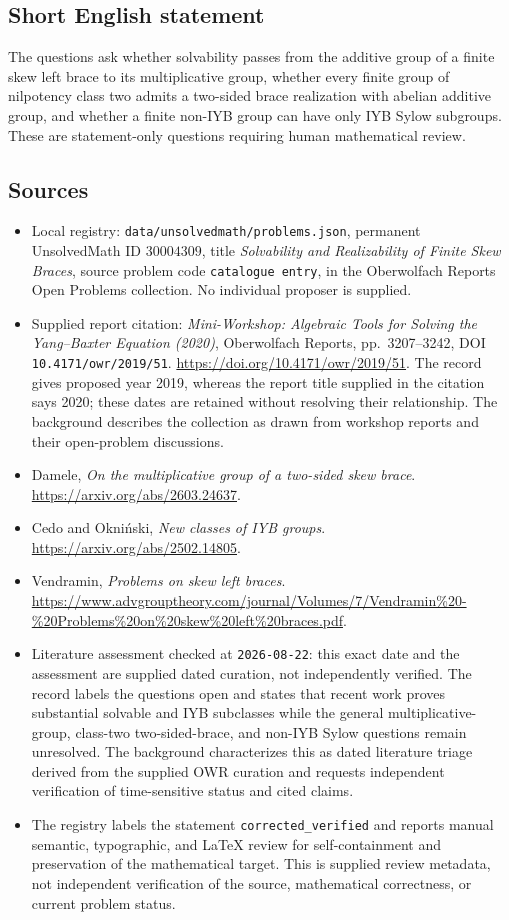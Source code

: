\documentclass[11pt]{article}
\begin{document}
\subsection{Short English statement}
The questions ask whether solvability passes from the additive group of a finite skew left brace to its multiplicative group, whether every finite group of nilpotency class two admits a two-sided brace realization with abelian additive group, and whether a finite non-IYB group can have only IYB Sylow subgroups. These are statement-only questions requiring human mathematical review.
\subsection{Sources}
\begin{itemize}
\item Local registry: \texttt{data/unsolvedmath/problems.json}, permanent UnsolvedMath ID \(30004309\), title \emph{Solvability and Realizability of Finite Skew Braces}, source problem code \texttt{catalogue entry}, in the Oberwolfach Reports Open Problems collection. No individual proposer is supplied.
\item Supplied report citation: \emph{Mini-Workshop: Algebraic Tools for Solving the Yang--Baxter Equation (2020)}, Oberwolfach Reports, pp.~3207--3242, DOI \texttt{10.4171/owr/2019/51}. \url{https://doi.org/10.4171/owr/2019/51}. The record gives proposed year 2019, whereas the report title supplied in the citation says 2020; these dates are retained without resolving their relationship. The background describes the collection as drawn from workshop reports and their open-problem discussions.
\item Damele, \emph{On the multiplicative group of a two-sided skew brace}. \url{https://arxiv.org/abs/2603.24637}.
\item Cedo and Okniński, \emph{New classes of IYB groups}. \url{https://arxiv.org/abs/2502.14805}.
\item Vendramin, \emph{Problems on skew left braces}. \url{https://www.advgrouptheory.com/journal/Volumes/7/Vendramin%20-%20Problems%20on%20skew%20left%20braces.pdf}.
\item Literature assessment checked at \texttt{2026-08-22}: this exact date and the assessment are supplied dated curation, not independently verified. The record labels the questions open and states that recent work proves substantial solvable and IYB subclasses while the general multiplicative-group, class-two two-sided-brace, and non-IYB Sylow questions remain unresolved. The background characterizes this as dated literature triage derived from the supplied OWR curation and requests independent verification of time-sensitive status and cited claims.
\item The registry labels the statement \texttt{corrected\_verified} and reports manual semantic, typographic, and LaTeX review for self-containment and preservation of the mathematical target. This is supplied review metadata, not independent verification of the source, mathematical correctness, or current problem status.
\end{itemize}
\end{document}
